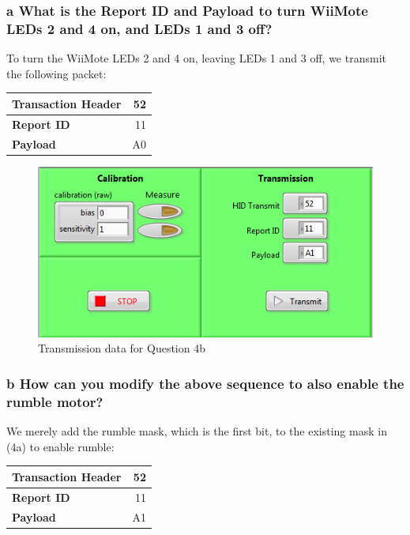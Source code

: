 \documentclass[10pt,a4paper]{article}
\begin{document}
    \subsubsection*{a What is the Report ID and Payload to turn WiiMote LEDs 2 and 4 on, and LEDs 1 and 3 off?}
    To turn the WiiMote LEDs 2 and 4 on, leaving LEDs 1 and 3 off, we transmit the following packet:
    \begin{tabular}{l | r}
        \textbf{Transaction Header}         & 52 \\
        \hline
        \textbf{Report ID}                  & 11 \\
        \hline
        \textbf{Payload}                    & A0 \\
    \end{tabular}
    \begin{figure}[H]
        \centering
        \includegraphics{../lab1_data/lab1_4b.PNG}
        \caption{Transmission data for Question 4b}
    \end{figure}
    \subsubsection*{b How can you modify the above sequence to also enable the rumble motor?}
    We merely add the rumble mask, which is the first bit, to the existing mask in (4a) to enable rumble:
    \begin{tabular}{l | r}
        \textbf{Transaction Header}         & 52 \\
        \hline
        \textbf{Report ID}                  & 11 \\
        \hline
        \textbf{Payload}                    & A1 \\
    \end{tabular}
\end{document}
